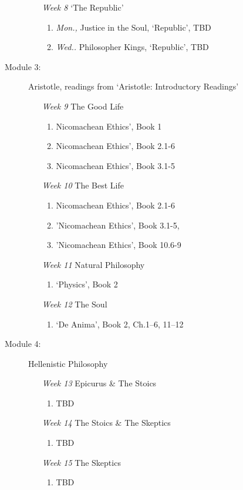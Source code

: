 \documentclass[article,oneside]{memoir}
\begin{document}
\begin{description}
\begin{enumerate}
\item[\textit{Week 8}] `The Republic'
\begin{enumerate}
\item \emph{Mon.,} Justice in the Soul, `Republic', TBD %
\item \emph{Wed..} Philosopher Kings, `Republic', TBD
\end{enumerate}
\end{enumerate}

\item[Module 3:] Aristotle, readings from `Aristotle: Introductory Readings'
\begin{enumerate}
\item[\textit{Week 9}]  The Good Life
\begin{enumerate}
\item Nicomachean Ethics', Book 1
\item Nicomachean Ethics', Book 2.1-6
\item Nicomachean Ethics', Book 3.1-5 

\end{enumerate}
\item[\textit{Week 10}] The Best Life
\begin{enumerate}
\item Nicomachean Ethics', Book 2.1-6
\item 'Nicomachean Ethics', Book 3.1-5, 
\item 'Nicomachean Ethics', Book 10.6-9

\end{enumerate}

\item[\textit{Week 11}] Natural Philosophy
\begin{enumerate}
\item `Physics', Book 2
\end{enumerate}
\item[\textit{Week 12}] The Soul
\begin{enumerate}
\item `De Anima', Book 2, Ch.1--6, 11--12
\end{enumerate}
\end{enumerate}

\item[Module 4:] Hellenistic Philosophy
\begin{enumerate}
\item[ \textit{Week 13}] Epicurus \& The Stoics
\begin{enumerate}
\item TBD
\end{enumerate}
\item[ \textit{Week 14}] The Stoics \& The Skeptics
\begin{enumerate}
\item TBD
\end{enumerate}
\item[\textit{Week 15}] The Skeptics
\begin{enumerate}
 \item TBD
\end{enumerate}

\end{enumerate}
\end{description}
\end{document}
